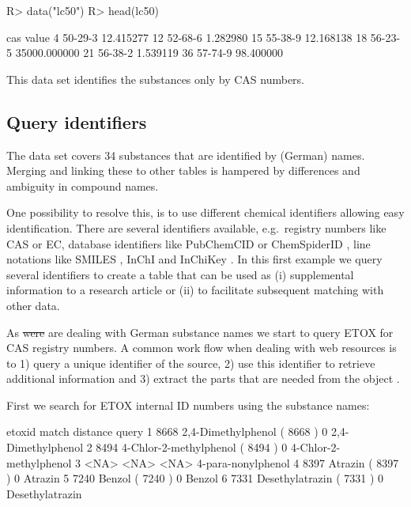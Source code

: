 \documentclass[article, shortnames]{jss}\usepackage[]{graphicx}\usepackage[]{color}
\providecommand{\DIFadd}[1]{{\protect\color{green}\uwave{#1}}} %
\providecommand{\DIFdel}[1]{{\protect\color{red}\sout{#1}}}                      %
\providecommand{\DIFaddbegin}{} %
\providecommand{\DIFaddend}{} %
\providecommand{\DIFdelbegin}{} %
\providecommand{\DIFdelend}{} %
\begin{document}
\begin{CodeChunk}
\begin{CodeInput}
R> data("lc50")
R> head(lc50)
\end{CodeInput}
\begin{CodeOutput}
       cas        value
4  50-29-3    12.415277
12 52-68-6     1.282980
15 55-38-9    12.168138
18 56-23-5 35000.000000
21 56-38-2     1.539119
36 57-74-9    98.400000
\end{CodeOutput}
\end{CodeChunk}

This data set identifies the substances only by CAS numbers.


\subsection[Query identifiers]{Query identifiers}
The  data set covers 34 substances that are identified by (German) names.
Merging and linking these to other tables is hampered by differences and ambiguity in compound names.

One possibility to resolve this, is to use different chemical identifiers allowing easy identification.
There are several identifiers available, e.g.\  registry numbers like CAS or EC, database identifiers like PubChemCID \citep{Kim_2016} or ChemSpiderID \citep{pence_chemspider:_2010}, line notations like SMILES \citep{Weininger_1990}, InChI and InChiKey \citep{Heller_McNaught_Pletnev_Stein_Tchekhovskoi_2015}. 
In this first example we query several identifiers to create a table that can be used as (i) supplemental information to a research article or (ii) to facilitate subsequent matching with other data.

As \DIFdelbegin \DIFdel{were }\DIFdelend \DIFaddbegin \DIFadd{we are }\DIFaddend are dealing with German substance names we start to query ETOX for CAS registry numbers.
A common work flow when dealing with web resources is to 1) query a unique identifier of the source, 2) use this identifier to retrieve additional information and 3) extract the parts that are needed from the  object \citep{Chamberlain_Szocs_2013}.

First we search for ETOX internal ID numbers using the substance names:

\begin{CodeChunk}
\begin{CodeOutput}
  etoxid                           match distance                  query
1   8668     2,4-Dimethylphenol ( 8668 )        0     2,4-Dimethylphenol
2   8494 4-Chlor-2-methylphenol ( 8494 )        0 4-Chlor-2-methylphenol
3   <NA>                            <NA>     <NA>     4-para-nonylphenol
4   8397                Atrazin ( 8397 )        0                Atrazin
5   7240                 Benzol ( 7240 )        0                 Benzol
6   7331        Desethylatrazin ( 7331 )        0        Desethylatrazin
\end{CodeOutput}
\end{CodeChunk}
\end{document}
